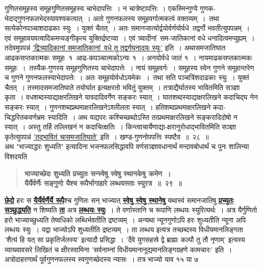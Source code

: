 \documentclass[11pt, openany]{book}
\begin{document}
\newpage
 
\begin{sloppypar}
\noindent गुणितसमूहस्य समूहगुणितसमूहस्य चाभेदापत्तिः~। न चात्रेष्टापत्तिः~। एकस्मिन्गुण्ये गुणक-भेदाद्गुणनफलभेदस्यावश्यकत्वात्~। अतो गुणनफलस्य समूहवर्गात्मकत्वं वक्तव्यम्~।~तथा सत्येकोनपञ्चाशदाढकाः स्युः~। युक्तं चैतत्~। अतः समानजात्योर्द्वयोर्वर्णयोर्वधे~तद्वर्गो भवतीत्युपपन्नम्~। एवं समूहावयवत्वादिकमप्यङ्गीकृत्य युक्तिर्द्रष्टव्या~। एवं त्र्यादीनां~सम-जातिकानां वधे धनादित्वमप्यूह्यम्~। तदेवमुपपन्नं \hyperref[3.26]{'द्वित्र्यादिकानां समजातिकानां~वधे तु तद्वर्गघनादयः स्युः'} इति~। अथासमजातिघात आढकसप्तकात्मकः समूहः~१~आढ-कपञ्चात्मकोऽन्यः १~। अनयोर्वधे जातं १~। नायमाढकसप्तकात्मकः समूहः~।~तस्यैक-गुणस्य समूहगुणितस्य चाभेदापत्तेः~। नायं समूहवर्गः~। समूहस्य स्वेन गुणने समूहान्तरेण च गुणने गुणनफलस्याभेदापत्तेः~। अतः समूहयोर्वधोऽयमेकः~।~तथा सति पञ्चत्रिंशदाढकाः स्युः~। युक्तं चैतत्~। तस्मादसमजातिघाते तयोर्घात इत्यक्षरतो भवितुं युक्तम्~। तत्राद्यैर्घातस्य भावितमिति सञ्ज्ञा कृता~। वधशब्दस्याद्याक्षरलिखने यावदादिवर्गेण सङ्करः स्यात्~। घातशब्दस्याद्याक्षरलिखने कदाचिद्घ नेन सङ्करः स्यात्~। गुणनशब्दप्रथमाक्षरलिखनेऽश्लीलता स्यात्~। हतिशब्दप्रथमाक्षरलिखने कदा-चिद्धरितकवर्णभ्रमः स्यादिति~। अथ यद्यपरः कश्चिच्छब्दोऽस्ति तत्प्रथमाक्षरलिखने सङ्करादिदोषो न स्यात्~। अस्तु तर्हि तल्लिखनं न कदाचित्क्षतिः~। किन्त्वाचार्येणाद्या-क्षरानुरोधाद्भावितमिति सञ्ज्ञा कृतेत्युपपन्नं \hyperref[3.26]{'तद्भावितं चासमजातिघाते'} इति~। खण्ड-गुणनोपपत्तिः स्पष्टैव~॥~२८~॥\\

{\small अथ {\color{violet}"भाज्याद्धरः शुध्यति"} इत्यादिना भजनफलसिद्धावपि वर्णसञ्ज्ञावधानार्थं मन्दावबोधार्थं च पुनः शालिन्या विशदयति\textendash }

 \label{3.29}
\begin{quote}
{\large \textbf{{\color{purple}भाज्याच्छेदः शुध्यति प्रच्युतः सन्स्वेषु स्वेषु स्थानकेषु क्रमेण~।\\
यैर्यैर्वर्णैः सङ्गुणो यैश्च रूपैर्भागाहारे लब्धयस्ताः स्युरत्र~॥~२९~॥}}}
\end{quote}

\hyperref[3.29]{\textbf{छेदो}} हरः स \hyperref[3.29]{\textbf{यैर्यैर्वर्णैर्यै रूपै}}श्च गुणितः सन् भाज्यात् \hyperref[3.29]{\textbf{स्वेषु स्वेषु स्थानेषु}} यथास्वं समानजातिषु \hyperref[3.29]{\textbf{प्रच्युतः सञ्छुद्ध्यति}} न शिष्यति \hyperref[3.29]{\textbf{ता}} अत्र \hyperref[3.29]{\textbf{लब्धयः स्युः}}~। ते वर्णास्तानि च रूपाणि लब्धयः स्युरित्यर्थः~। अत्र यैर्गुणितो हरो भाज्याच्छुध्यति तेष्वधिको लब्धिर्भवतीति द्रष्टव्यम्~। अन्यथा न्यूनगुणोऽपि हरः शुध्यतीति न्यूना अपि लब्धयः स्युः~। यद्वा भाज्योऽपि शुध्यतीति द्रष्टव्यम्~। ता लब्धय इत्यत्र तच्छब्दस्य विधीयमानलिङ्गता {\color{violet}'शैत्यं हि यत् सा प्रकृतिर्जलस्य'} इत्यादौ प्रसिद्धा~। {\color{violet}'दैवे युगसहस्रे द्वे ब्राह्मः कल्पौ तु तौ नृणाम्'} इत्यस्य व्याख्यावसरे लिखितं च {\color{violet}क्षीरस्वामिना 'सर्वनाम्नां विधीयमानानूद्यमानलिङ्गग्रहणे कामचारः'} इति~। अत्रोदाहरणार्थं पूर्वगुणनफलस्य स्वगुणच्छेदस्य न्यासः~। तत्र भाज्यो याव १५ या ७ 
\end{sloppypar}
\end{document}
